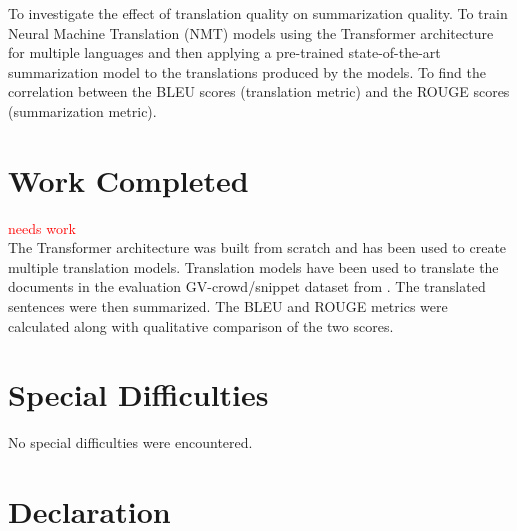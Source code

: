 \documentclass[12pt,a4paper,twoside,openright]{report}
\newcommand{\red}[1]{\textcolor{red}{#1}}
\begin{document}
To investigate the effect of translation quality on summarization quality. To train Neural Machine Translation (NMT) models using the Transformer architecture for multiple languages and then applying a pre-trained state-of-the-art summarization model to the translations produced by the models. To find the correlation between the BLEU scores (translation metric) and the ROUGE scores (summarization metric).




\section*{Work Completed}
\red{needs work}\\
The Transformer architecture was built from scratch and has been used to create multiple translation models. Translation models have been used to translate the documents in the evaluation GV-crowd/snippet dataset from \cite{nguyen-daume-iii-2019-global}. The translated sentences were then summarized. The BLEU and ROUGE metrics were calculated along with qualitative comparison of the two scores.

\section*{Special Difficulties}
No special difficulties were encountered.



\newpage
\section*{Declaration}
\end{document}
